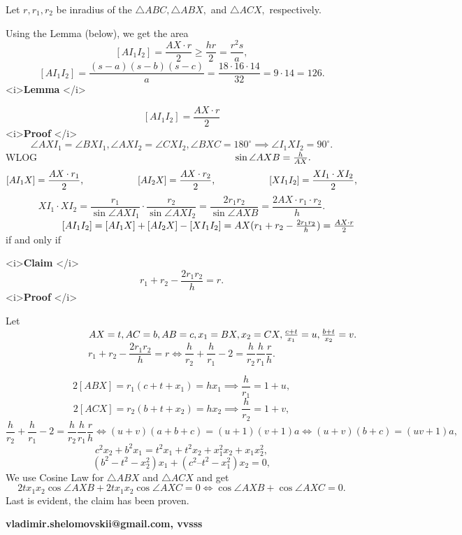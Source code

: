 \begin{enumerate}
 Let $r, r_1, r_2$ be inradius of the $\triangle ABC, \triangle ABX,$ and $\triangle ACX,$ respectively.

 Using the Lemma (below), we get the area
 \[[ AI_1 I_2] = \frac{AX \cdot r }{2} \ge \frac { hr}{2} =\frac{ r^2 s}{a},\]
 \[[ AI_1 I_2]=  \frac{(s-a)(s-b)(s-c)}{a} =   \frac{18 \cdot 16 \cdot 14}{32} = 9 \cdot 14 = \boxed {126}.\]<i>\textbf{Lemma }</i>

 \[[AI_1 I_2] = \frac{AX \cdot r }{2}\]
<i>\textbf{Proof }</i>
 \[\angle AXI_1 = \angle BXI_1, \angle AXI_2 = \angle CXI_2, \angle BXC = 180^\circ \implies \angle I_1 X I_2 = 90^\circ.\]WLOG $\hspace{70mm} \sin \angle AXB = \frac {h}{AX}.$ 
 \[[AI_1 X] =\frac{ AX\cdot r_1}{2}, \hspace{20mm} [AI_2 X] =\frac{ AX\cdot r_2}{2},\hspace{20mm}[XI_1 I_2] =\frac{XI_1 \cdot XI_2}{2},\] 
 \[XI_1  \cdot XI_2 = \frac{r_1}{\sin \angle AXI_1} \cdot \frac{r_2}{\sin \angle AXI_2} =  \frac{2 r_1 r_2}{\sin \angle AXB} =  \frac{2 AX \cdot r_1 \cdot r_2 }{h}.\]$\hspace{20mm} [AI_1 I_2] = [AI_1 X] + [AI_2 X] - [XI_1 I_2] = AX (r_1 + r_2 -  \frac{2 r_1 r_2 }{h}) =  \frac{AX \cdot r }{2}$ if and only if

 <i>\textbf{Claim }</i>
 \[r_1 + r_2 -  \frac{2 r_1 r_2 }{h} = r.\]<i>\textbf{Proof }</i>

 Let $\hspace{30mm} AX = t, AC = b, AB = c, x_1 = BX, x_2 = CX, \frac{c+t}{x_1} = u, \frac{b+t}{x_2} = v.$
 \[r_1 + r_2 -  \frac{2 r_1 r_2 }{h} = r  \iff  \frac{h}{r_2} +  \frac{h}{r_1}- 2 = \frac{h}{r_2}  \frac{h}{r_1} \frac{r}{h}.\]

 \[2[ABX] = r_1 (c + t + x_1) = h x_1 \implies \frac{h}{r_1} = 1 + u,\]
 \[2[ACX] = r_2 (b + t + x_2) = h x_2 \implies \frac{h}{r_2} = 1 + v,\]
 \[\frac{h}{r_2} +  \frac{h}{r_1}- 2 = \frac{h}{r_2}  \frac{h}{r_1} \frac{r}{h}  \iff (u+v)(a+b+c)=(u+1)(v+1)a \iff (u+v)(b+c)=(uv+1)a,\]
 \[c^2 x_2 + b^2 x_1 = t^2 x_1 + t^2 x_2 + x_1^2 x_2 + x_1 x_2^2,\]
 \[(b^2 -t^2 -x_2^2)x_1 + (c^2 –t^2 -x_1^2)x_2 = 0,\]We use Cosine Law for $\triangle ABX$ and $\triangle ACX$ and get 
 \[2 t x_1 x_2 \cos \angle AXB +  2 t x_1 x_2 \cos \angle AXC = 0  \iff \cos \angle AXB + \cos \angle AXC = 0.\]Last is evident, the claim has been proven.

 \textbf{vladimir.shelomovskii@gmail.com, vvsss}

 




\end{enumerate}
